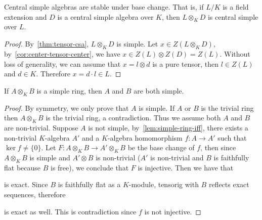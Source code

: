 \begin{corollary}\label{cor:csa-basechange}
  Central simple algebras are stable under base change. That is, if $L/K$ is a
  field extension and $D$ is a central simple algebra over $K$, then
  $L\otimes_{K} D$ is central simple over $L$. \leanok
\end{corollary}

\begin{proof}
  By~\cref{thm:tensor-csa}, $L\otimes_{K} D$ is simple. Let
  $x\in Z\left(L\otimes_{K}D\right)$, by~\cref{cor:center-tensor-center}, we
  have $x\in Z\left(L\right)\otimes Z\left(D\right)=Z\left(L\right)$. Without
  loss of generality, we can assume that $x = l \otimes d$ is a pure tensor,
  then $l \in Z\left(L\right)$ and $d \in K$. Therefore $x = d\cdot l \in L$.
\end{proof}

\begin{theorem}\label{thm:tensor-simple-implies-simple}
  If $A\otimes_{K} B$ is a simple ring, then $A$ and $B$ are both simple.
  \leanok
\end{theorem}
\begin{proof}
  By symmetry, we only prove that $A$ is simple.
  If $A$ or $B$ is the trivial ring then $A\otimes_{K} B$ is the trivial ring, a contradiction. Thus we assume both $A$ and $B$ are non-trivial. Suppose $A$ is not simple, by~\cref{lem:simple-ring-iff}, there exists a non-trivial $K$-algebra $A'$ and a $K$-algebra homomorphism $f : A \to A'$ such that $\ker f \not= \{0\}$. Let $F : A \otimes_{K} B\to A'\otimes_{K} B$ be the base change of $f$, then since $A\otimes_{K} B$ is simple and $A'\otimes B$ is non-trivial ($A'$ is non-trivial and $B$ is faithfully flat because $B$ is free), we conclude that $F$ is injective. Then we have that
  \begin{center}
  \end{center}
  is exact. Since $B$ is faithfully flat as a $K$-module, tensorig with $B$ reflects exact sequences, therefore
  \begin{center}
  \end{center}
  is exact as well. This is contradiction since $f$ is not injective.
\end{proof}

